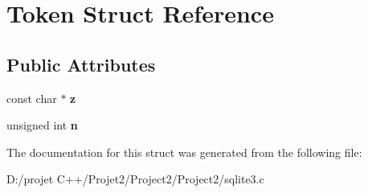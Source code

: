 \hypertarget{struct_token}{}\section{Token Struct Reference}
\label{struct_token}
\subsection*{Public Attributes}
\begin{DoxyCompactItemize}
\item 
\mbox{\label{struct_token_a57b502141e3018e4a02773424acb4ffd}} 
const char $\ast$ {\bfseries z}
\item 
\mbox{\label{struct_token_ad8442439e00ab9713a9b91a53e44c2aa}} 
unsigned int {\bfseries n}
\end{DoxyCompactItemize}


The documentation for this struct was generated from the following file\+:\begin{DoxyCompactItemize}
\item 
D\+:/projet C++/\+Projet2/\+Project2/\+Project2/sqlite3.\+c\end{DoxyCompactItemize}
